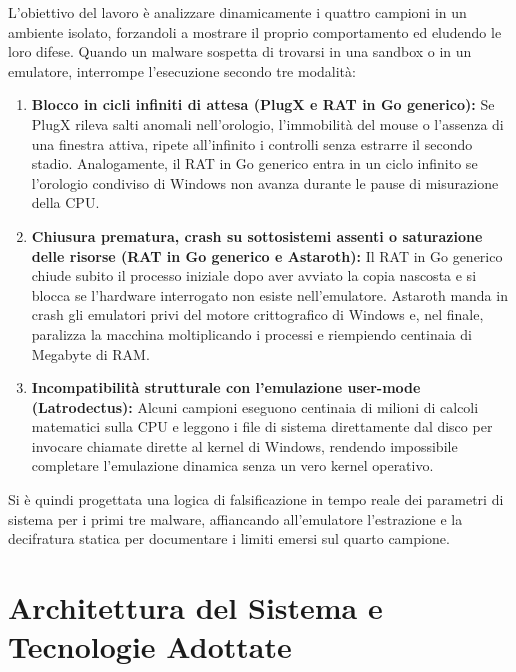 \documentclass[11pt, a4paper]{article}
\begin{document}
	L'obiettivo del lavoro è analizzare dinamicamente i quattro campioni in un ambiente isolato, forzandoli a mostrare il proprio comportamento ed eludendo le loro difese. Quando un malware sospetta di trovarsi in una sandbox o in un emulatore, interrompe l'esecuzione secondo tre modalità:
	
	\begin{enumerate}
		\item \textbf{Blocco in cicli infiniti di attesa (PlugX e RAT in Go generico):} Se PlugX rileva salti anomali nell'orologio, l'immobilità del mouse o l'assenza di una finestra attiva, ripete all'infinito i controlli senza estrarre il secondo stadio. Analogamente, il RAT in Go generico entra in un ciclo infinito se l'orologio condiviso di Windows non avanza durante le pause di misurazione della CPU.
		
		\item \textbf{Chiusura prematura, crash su sottosistemi assenti o saturazione delle risorse (RAT in Go generico e Astaroth):} Il RAT in Go generico chiude subito il processo iniziale dopo aver avviato la copia nascosta e si blocca se l'hardware interrogato non esiste nell'emulatore. Astaroth manda in crash gli emulatori privi del motore crittografico di Windows e, nel finale, paralizza la macchina moltiplicando i processi e riempiendo centinaia di Megabyte di RAM.
		
		\item \textbf{Incompatibilità strutturale con l'emulazione user-mode (Latrodectus):} Alcuni campioni eseguono centinaia di milioni di calcoli matematici sulla CPU e leggono i file di sistema direttamente dal disco per invocare chiamate dirette al kernel di Windows, rendendo impossibile completare l'emulazione dinamica senza un vero kernel operativo.
	\end{enumerate}
	
	Si è quindi progettata una logica di falsificazione in tempo reale dei parametri di sistema per i primi tre malware, affiancando all'emulatore l'estrazione e la decifratura statica per documentare i limiti emersi sul quarto campione.
	
	\section{Architettura del Sistema e Tecnologie Adottate}
	
\end{document}
